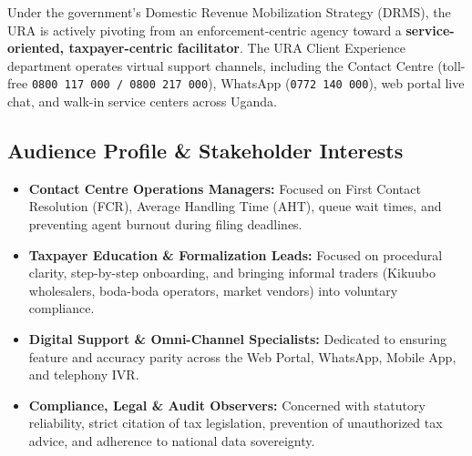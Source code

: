 \documentclass[10pt,a4paper]{article}
\begin{document}
Under the government's Domestic Revenue Mobilization Strategy (DRMS), the URA is actively pivoting from an enforcement-centric agency toward a \textbf{service-oriented, taxpayer-centric facilitator}. The URA Client Experience department operates virtual support channels, including the Contact Centre (toll-free \texttt{0800 117 000 / 0800 217 000}), WhatsApp (\texttt{0772 140 000}), web portal live chat, and walk-in service centers across Uganda.

\subsection{Audience Profile \& Stakeholder Interests}
\begin{itemize}
  \item \textbf{Contact Centre Operations Managers:} Focused on First Contact Resolution (FCR), Average Handling Time (AHT), queue wait times, and preventing agent burnout during filing deadlines.
  \item \textbf{Taxpayer Education \& Formalization Leads:} Focused on procedural clarity, step-by-step onboarding, and bringing informal traders (Kikuubo wholesalers, boda-boda operators, market vendors) into voluntary compliance.
  \item \textbf{Digital Support \& Omni-Channel Specialists:} Dedicated to ensuring feature and accuracy parity across the Web Portal, WhatsApp, Mobile App, and telephony IVR.
  \item \textbf{Compliance, Legal \& Audit Observers:} Concerned with statutory reliability, strict citation of tax legislation, prevention of unauthorized tax advice, and adherence to national data sovereignty.
\end{itemize}
\end{document}
